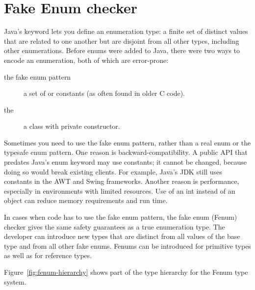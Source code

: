 \htmlhr
\chapter{Fake Enum checker\label{fenum-checker}}

Java's 
keyword lets you define an enumeration type: a finite set of distinct values
that are related to one another but are disjoint from all other
types, including other enumerations.
Before enums were added to Java, there were two ways to encode an
enumeration, both of which are error-prone:

\begin{description}
\item[the fake enum pattern]  a set of  or 
  constants (as often found in older C code).

\item[the ]  a class with private constructor.
\end{description}

Sometimes you need to use the fake enum pattern,
rather than a real enum or the typesafe enum pattern.
%
One reason is backward-compatibility.  A public API that predates Java's
enum keyword may use  constants; it cannot be changed, because
doing so would break existing clients.  For example, Java's JDK still uses
 constants in the AWT and Swing frameworks.
%
Another reason is performance, especially in environments with limited
resources.  Use of an int instead of an object can 
reduce memory requirements and run time.

In cases when code has to use the fake enum pattern, the fake enum (Fenum)
checker gives the same safety guarantees as a true enumeration type. 
The developer can introduce new types that are distinct from all values of the
base type and from all other fake enums. Fenums can be introduced for
primitive types as well as for reference types.

Figure~\ref{fig:fenum-hierarchy} shows part of the type hierarchy for the
Fenum type system.

